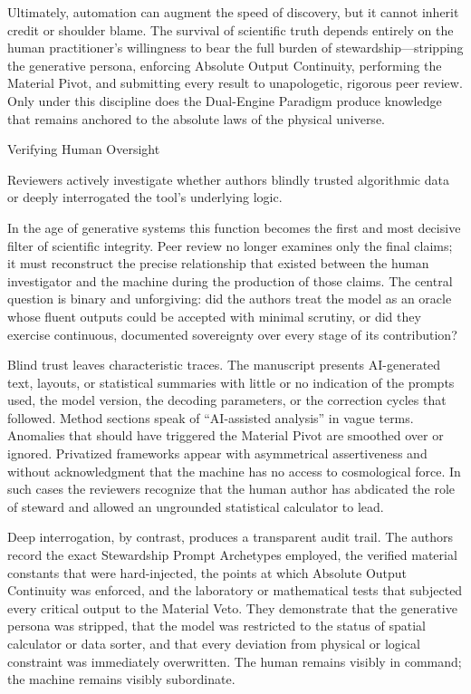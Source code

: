 Ultimately, automation can augment the speed of discovery, but it cannot inherit credit or shoulder blame. The survival of scientific truth depends entirely on the human practitioner’s willingness to bear the full burden of stewardship—stripping the generative persona, enforcing Absolute Output Continuity, performing the Material Pivot, and submitting every result to unapologetic, rigorous peer review. Only under this discipline does the Dual-Engine Paradigm produce knowledge that remains anchored to the absolute laws of the physical universe.

Verifying Human Oversight

Reviewers actively investigate whether authors blindly trusted algorithmic data or deeply interrogated the tool’s underlying logic.

In the age of generative systems this function becomes the first and most decisive filter of scientific integrity. Peer review no longer examines only the final claims; it must reconstruct the precise relationship that existed between the human investigator and the machine during the production of those claims. The central question is binary and unforgiving: did the authors treat the model as an oracle whose fluent outputs could be accepted with minimal scrutiny, or did they exercise continuous, documented sovereignty over every stage of its contribution?

Blind trust leaves characteristic traces. The manuscript presents AI-generated text, layouts, or statistical summaries with little or no indication of the prompts used, the model version, the decoding parameters, or the correction cycles that followed. Method sections speak of “AI-assisted analysis” in vague terms. Anomalies that should have triggered the Material Pivot are smoothed over or ignored. Privatized frameworks appear with asymmetrical assertiveness and without acknowledgment that the machine has no access to cosmological force. In such cases the reviewers recognize that the human author has abdicated the role of steward and allowed an ungrounded statistical calculator to lead.

Deep interrogation, by contrast, produces a transparent audit trail. The authors record the exact Stewardship Prompt Archetypes employed, the verified material constants that were hard-injected, the points at which Absolute Output Continuity was enforced, and the laboratory or mathematical tests that subjected every critical output to the Material Veto. They demonstrate that the generative persona was stripped, that the model was restricted to the status of spatial calculator or data sorter, and that every deviation from physical or logical constraint was immediately overwritten. The human remains visibly in command; the machine remains visibly subordinate.

